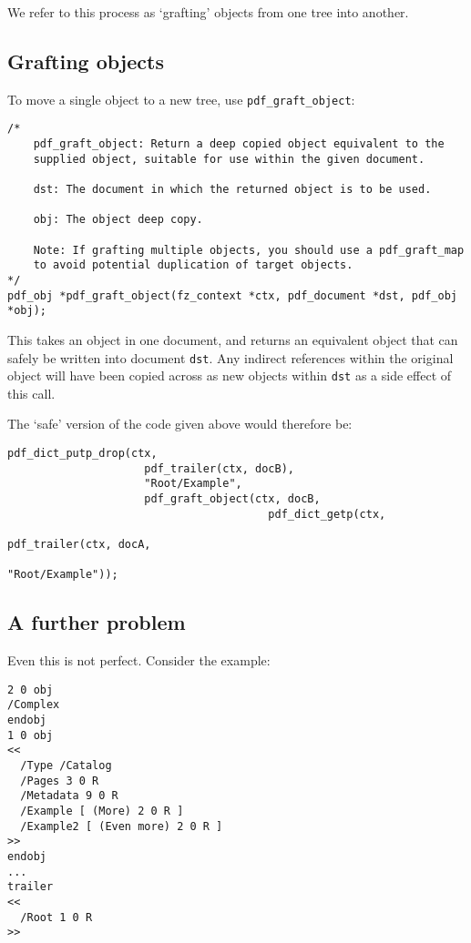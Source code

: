 \documentclass[oneside]{book}
\begin{document}
We refer to this process as `grafting' objects from one tree into another.

\subsection{Grafting objects}

To move a single object to a new tree, use \texttt{pdf\_graft\_object}:

\begin{lstlisting}
/*
	pdf_graft_object: Return a deep copied object equivalent to the
	supplied object, suitable for use within the given document.

	dst: The document in which the returned object is to be used.

	obj: The object deep copy.

	Note: If grafting multiple objects, you should use a pdf_graft_map
	to avoid potential duplication of target objects.
*/
pdf_obj *pdf_graft_object(fz_context *ctx, pdf_document *dst, pdf_obj *obj);
\end{lstlisting}

This takes an object in one document, and returns an equivalent object that can safely be written into document \texttt{dst}. Any indirect references within the original object will have been copied across as new objects within \texttt{dst} as a side effect of this call.

The `safe' version of the code given above would therefore be:

\begin{lstlisting}
pdf_dict_putp_drop(ctx,
                     pdf_trailer(ctx, docB),
                     "Root/Example",
                     pdf_graft_object(ctx, docB,
                                        pdf_dict_getp(ctx,
                                                        pdf_trailer(ctx, docA,
                                                        "Root/Example")); 
\end{lstlisting}

\subsection{A further problem}

Even this is not perfect. Consider the example:

\begin{lstlisting}
2 0 obj
/Complex
endobj
1 0 obj
<<
  /Type /Catalog
  /Pages 3 0 R
  /Metadata 9 0 R
  /Example [ (More) 2 0 R ]
  /Example2 [ (Even more) 2 0 R ]
>>
endobj
...
trailer
<<
  /Root 1 0 R
>>
\end{lstlisting}
\end{document}
